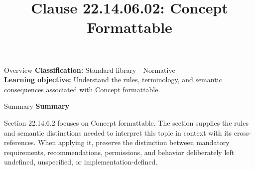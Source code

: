 \documentclass[10pt,letterpaper]{article}
\title{Clause 22.14.06.02: Concept Formattable}
\author{}
\date{}
\begin{document}
\maketitle
\begin{CornellOverviewBox}{Overview}
\textbf{Classification:} Standard library - Normative\\[2pt]
\textbf{Learning objective:} Understand the rules, terminology, and semantic consequences associated with Concept formattable.
\end{CornellOverviewBox}\begin{CornellSummaryBox}{Summary}
{\sffamily\bfseries\color{Accent} Summary}\par\vspace{3pt}Section 22.14.6.2 focuses on Concept formattable. The section supplies the rules and semantic distinctions needed to interpret this topic in context with its cross-references. When applying it, preserve the distinction between mandatory requirements, recommendations, permissions, and behavior deliberately left undefined, unspecified, or implementation-defined.
\end{CornellSummaryBox}
\end{document}
